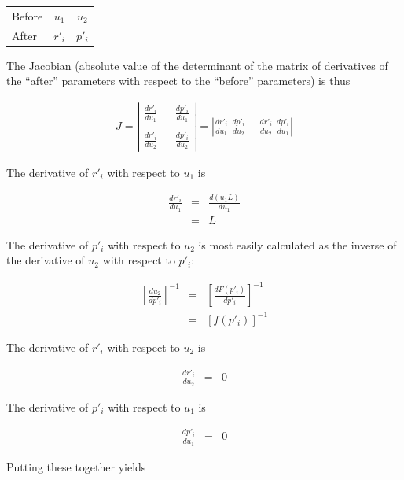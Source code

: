 \documentclass[12pt]{article}
\begin{document}
\begin{center}
\begin{tabular}{lcc}
Before & $u_1$  & $u_2$ \\
After  & $r'_i$ & $p'_i$
\end{tabular}
\end{center}

The Jacobian (absolute value of the determinant of the matrix of derivatives of the ``after'' parameters with respect to the ``before'' parameters) is thus

\begin{eqnarray*}
J = \left| 
\begin{array}{ccc}
\frac{d r'_i}{d u_1} & & \frac{d p'_i}{d u_1} \\
& & \\
\frac{d r'_i}{d u_2} & & \frac{d p'_i}{d u_2}
\end{array}
\right|
= \left| \frac{d r'_i}{d u_1} \; \frac{d p'_i}{d u_2} - \frac{d r'_i}{d u_2} \; \frac{d p'_i}{d u_1} \right|
\end{eqnarray*}

The derivative of $r'_i$ with respect to $u_1$ is

\begin{eqnarray*}
\frac{d r'_i}{d u_1} & = & \frac{d (u_1 L)}{d u_1} \\
& = & L
\end{eqnarray*}

The derivative of $p'_i$ with respect to $u_2$ is most easily calculated as the inverse of the derivative of $u_2$ with respect to $p'_i$:

\begin{eqnarray*}
\left[ \frac{d u_2}{d p'_i} \right]^{-1} & = & \left[ \frac{d F(p'_i)}{d p'_i} \right]^{-1} \\
& = & \left[ f(p'_i) \right]^{-1}
\end{eqnarray*}

The derivative of $r'_i$ with respect to $u_2$ is 

\begin{eqnarray*}
\frac{d r'_i}{d u_2} & = & 0
\end{eqnarray*}

The derivative of $p'_i$ with respect to $u_1$ is

\begin{eqnarray*}
\frac{d p'_i}{d u_1} & = & 0
\end{eqnarray*}

Putting these together yields
\end{document}
